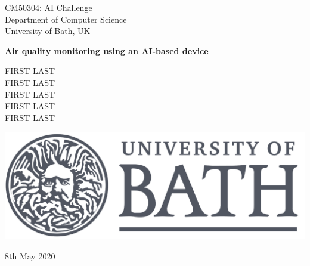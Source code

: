 \documentclass[10pt,english, openany]{book}
\begin{document}

\begin{titlepage}
	\clearpage\thispagestyle{empty}
	\centering
	\vspace{1cm}

	{\normalsize CM50304: AI Challenge \\ 
		Department of Computer Science \\
		University of Bath, UK \par}
		\vspace{3cm}
	{\Huge \textbf{Air quality monitoring using an AI-based device}} \\
	\vspace{4cm}
	{\normalsize FIRST LAST \\ %
	             FIRST LAST \\
	             FIRST LAST \\
	             FIRST LAST \\
	             FIRST LAST \par}
	\vspace{5cm}
    
    \centering \includegraphics[scale=0.1]{University_of_Bath_logo.png}
    
    \vspace{0.5cm}
		
	{\normalsize 8th May 2020 \par}
	
	\pagebreak

\end{titlepage}

\tableofcontents{}

\mainmatter
\end{document}
